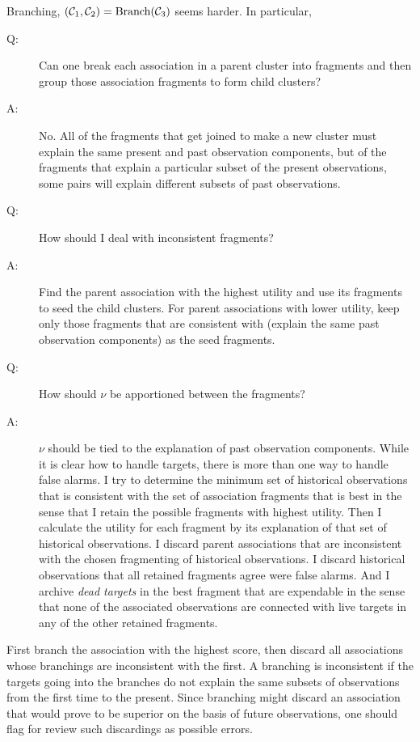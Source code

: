 \documentclass[11pt]{article}
\newcommand{\cC}{{\cal C}}
\begin{document}
Branching, $(\cC_1,\cC_2) = \text{Branch}(\cC_3)$ seems harder.  In
particular,
\begin{description}
\item[Q:] Can one break each association in a parent
  cluster into fragments and then group those association fragments to
  form child clusters?
\item[A:] No.  All of the fragments that get joined to make a new
  cluster must explain the same present and past observation
  components, but of the fragments that explain a particular subset of
  the present observations, some pairs will explain different subsets
  of past observations.
\item[Q:] How should I deal with inconsistent fragments?
\item[A:] Find the parent association with the highest utility and use
  its fragments to seed the child clusters.  For parent associations
  with lower utility, keep only those fragments that are consistent
  with (explain the same past observation components) as the seed
  fragments.
\item[Q:] How should $\nu$ be apportioned between the fragments?
\item[A:] $\nu$ should be tied to the explanation of past observation
  components.  While it is clear how to handle targets, there is more
  than one way to handle false alarms.  I try to determine the minimum
  set of historical observations that is consistent with the set of
  association fragments that is best in the sense that I retain the
  possible fragments with highest utility.  Then I calculate the
  utility for each fragment by its explanation of that set of
  historical observations.  I discard parent associations that are
  inconsistent with the chosen fragmenting of historical observations.
  I discard historical observations that all retained fragments agree
  were false alarms.  And I archive \emph{dead targets} in the best
  fragment that are expendable in the sense that none of the
  associated observations are connected with live targets in any of
  the other retained fragments.
\end{description}
First branch the association with the highest score, then discard all
associations whose branchings are inconsistent with the first.  A
branching is inconsistent if the targets going into the branches do
not explain the same subsets of observations from the first time to
the present.  Since branching might discard an association that would
prove to be superior on the basis of future observations, one should
flag for review such discardings as possible errors.
\end{document}
